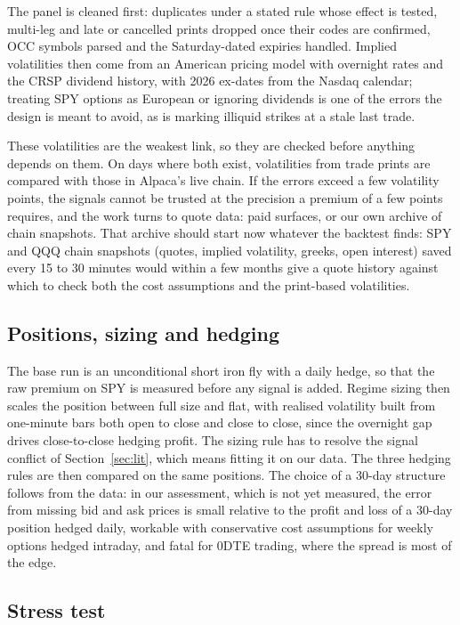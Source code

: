 \documentclass[10pt, a4paper, twocolumn]{article}
\begin{document}
The panel is cleaned first: duplicates under a stated rule whose effect is tested, multi-leg and late or cancelled prints dropped once their codes are confirmed, OCC symbols parsed and the Saturday-dated expiries handled. Implied volatilities then come from an American pricing model with overnight rates and the CRSP dividend history, with 2026 ex-dates from the Nasdaq calendar; treating SPY options as European or ignoring dividends is one of the errors the design is meant to avoid, as is marking illiquid strikes at a stale last trade.

These volatilities are the weakest link, so they are checked before anything depends on them. On days where both exist, volatilities from trade prints are compared with those in Alpaca's live chain. If the errors exceed a few volatility points, the signals cannot be trusted at the precision a premium of a few points requires, and the work turns to quote data: paid surfaces, or our own archive of chain snapshots. That archive should start now whatever the backtest finds: SPY and QQQ chain snapshots (quotes, implied volatility, greeks, open interest) saved every 15 to 30 minutes would within a few months give a quote history against which to check both the cost assumptions and the print-based volatilities.

\subsection{Positions, sizing and hedging}

The base run is an unconditional short iron fly with a daily hedge, so that the raw premium on SPY is measured before any signal is added. Regime sizing then scales the position between full size and flat, with realised volatility built from one-minute bars both open to close and close to close, since the overnight gap drives close-to-close hedging profit. The sizing rule has to resolve the signal conflict of Section~\ref{sec:lit}, which means fitting it on our data. The three hedging rules are then compared on the same positions. The choice of a 30-day structure follows from the data: in our assessment, which is not yet measured, the error from missing bid and ask prices is small relative to the profit and loss of a 30-day position hedged daily, workable with conservative cost assumptions for weekly options hedged intraday, and fatal for 0DTE trading, where the spread is most of the edge.

\subsection{Stress test}
\end{document}
